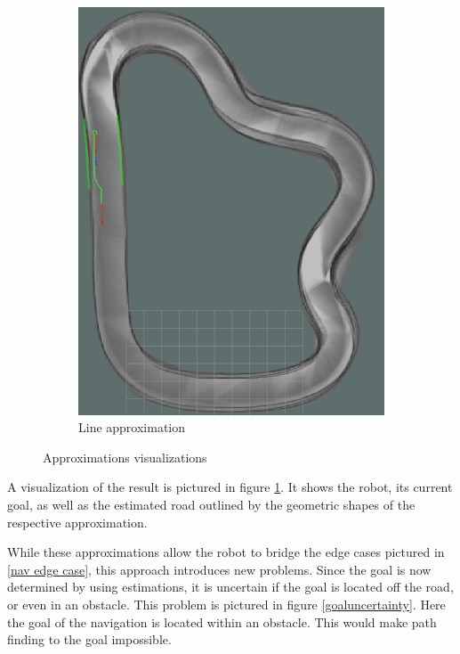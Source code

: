 \begin{figure}
\begin{subfigure}{.45\linewidth}
		\includegraphics[width=\textwidth]{Pictures/lineapprox}
		\caption{Line approximation}
	\end{subfigure}

	\caption{Approximations visualizations}
	\label{aproxvis}

\end{figure}

A visualization of the result is pictured in figure \ref{aproxvis}.
It shows the robot, its current goal, as well as the estimated road outlined by the geometric shapes of the respective approximation.


While these approximations allow the robot to bridge the edge cases pictured in \ref{nav edge case}, this approach introduces new problems. Since the goal is now determined by using estimations, it is uncertain if the goal is located off the road, or even in an obstacle. This problem is pictured in figure \ref{goaluncertainty}. Here the goal of the navigation is located within an obstacle. This would make path finding to the goal impossible.\\

